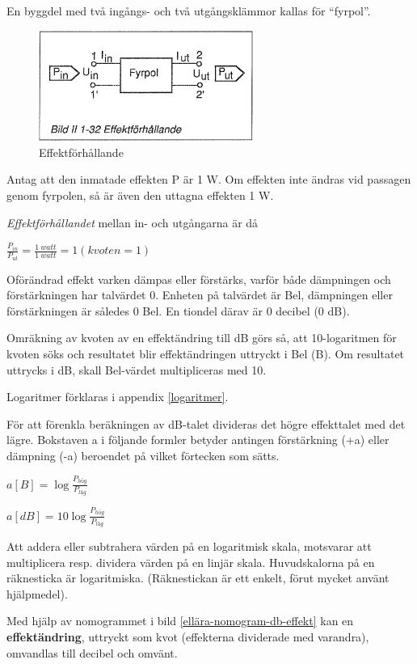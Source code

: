 En byggdel med två ingångs- och två utgångsklämmor kallas för ``fyrpol''.

\begin{figure}[th]
\begin{center}
\includegraphics[width=7cm]{images/bild_2_1-32}
\caption{Effektförhållande}
\label{fig:BildII1-32}
\end{center}
\end{figure}

Antag att den inmatade effekten P är 1 W. Om effekten inte ändras vid passagen
genom fyrpolen, så är även den uttagna effekten 1 W.

\emph{Effektförhållandet} mellan in- och utgångarna är då

\(\frac{P_{in}}{P_{ut}} = \frac{1\ watt}{1\ watt} = 1 (kvoten = 1)\)

Oförändrad effekt varken dämpas eller förstärks, varför både dämpningen och
förstärkningen har talvärdet 0. Enheten på talvärdet är Bel, dämpningen eller
förstärkningen är således 0 Bel. En tiondel därav är 0 decibel (0 dB).

Omräkning av kvoten av en effektändring till dB görs så, att 10-logaritmen för
kvoten söks och resultatet blir effektändringen uttryckt i Bel (B). Om
resultatet uttrycks i dB, skall Bel-värdet multipliceras med 10.

Logaritmer förklaras i appendix \ref{logaritmer}.

För att förenkla beräkningen av dB-talet divideras det högre effekttalet med det
lägre. Bokstaven a i följande formler betyder antingen förstärkning (+a) eller
dämpning (-a) beroendet på vilket förtecken som sätts.

\(a[B] = \log \frac{P_{hög}}{P_{låg}}\)

\(a[dB] = 10\log \frac{P_{hög}}{P_{låg}}\)

Att addera eller subtrahera värden på en logaritmisk skala, motsvarar att
multiplicera resp. dividera värden på en linjär skala. Huvudskalorna på en
räknesticka är logaritmiska. (Räknestickan är ett enkelt, förut mycket använt
hjälpmedel).

Med hjälp av nomogrammet i bild \ref{ellära-nomogram-db-effekt} kan en \textbf{effektändring}, uttryckt som kvot
(effekterna dividerade med varandra), omvandlas till decibel och omvänt.


